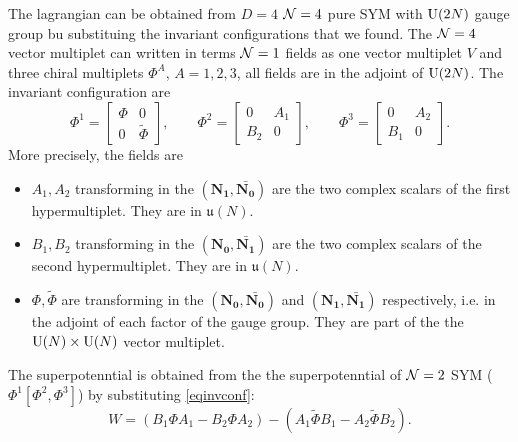         The lagrangian can be obtained from $D=4$ $\mathcal{N}=4$ pure SYM with $\text{U}(2N)$ gauge group bu substituing the invariant configurations that we found. The $\mathcal{N}=4$ vector multiplet can written in terms $\mathcal{N}=1$ fields as one vector multiplet $V$ and three chiral multiplets $\Phi^A$, $A=1,2,3$, all fields are in the adjoint of $\text{U}(2N)$. The invariant configuration are
        \begin{equation}
            \Phi^1=
            \begin{bmatrix}
                \Phi & 0 \\
                0 & \tilde{\Phi}
            \end{bmatrix},\qquad
            \Phi^2=
            \begin{bmatrix}
                0 & A_1 \\
                B_2 & 0
            \end{bmatrix},\qquad
            \Phi^3=
            \begin{bmatrix}
                0 & A_2 \\
                B_1 & 0
            \end{bmatrix}.\label{eqinvconf}
        \end{equation}
        More precisely, the fields are
        \begin{itemize}
            \item $A_1,A_2$ transforming in the $(\boldsymbol{N_1},\bar{\boldsymbol{N_0}})$ are the two complex scalars of the first hypermultiplet. They are in $\mathfrak{u}(N)$.
            \item $B_1,B_2$ transforming in the $(\boldsymbol{N_0},\bar{\boldsymbol{N_1}})$ are the two complex scalars of the second hypermultiplet. They are in $\mathfrak{u}(N)$.
            \item $\Phi,\tilde{\Phi}$ are transforming in the $(\boldsymbol{N_0},\bar{\boldsymbol{N_0}})$ and $(\boldsymbol{N_1},\bar{\boldsymbol{N_1}})$ respectively, i.e. in the adjoint of each factor of the gauge group. They are part of the the $\text{U}(N)\times\text{U}(N)$ vector multiplet.
        \end{itemize}
        The superpotenntial is obtained from the the superpotenntial of $\mathcal{N}=2$ SYM ($\Phi^1[\Phi^2,\Phi^3]$) by substituting \eqref{eqinvconf}:
        \begin{equation}
            W=(B_1\Phi A_1-B_2\Phi A_2)-(A_1\tilde{\Phi}B_1-A_2\tilde{\Phi}B_2).
        \end{equation}

